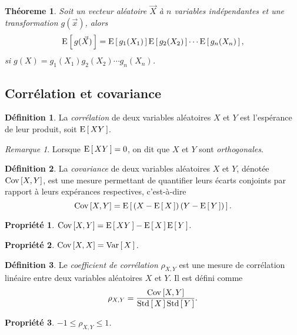 \documentclass[11pt]{article}
\makeatletter
\newcommand\Esp[1]{%
	\ensuremath{%
		\mathrm{E}\left[\,#1\,\right]%
	}%
}%
\newcommand\Var[1]{%
	\ensuremath{%
		\mathrm{Var}\left[\,#1\,\right]%
	}%
}%
\newcommand\Std[1]{%
	\ensuremath{%
		\mathrm{Std}\left[\,#1\,\right]%
	}%
}%
\newcommand\Cov[2]{%
	\ensuremath{%
		\mathrm{Cov}\left[#1,#2\right]%
	}%
}%
\newtheorem{theoreme}{Théoreme}[section]
\newtheorem{property}{Propriété}
\theoremstyle{remark}
\newtheorem*{remark}{Remarque}
\theoremstyle{definition}
\newtheorem*{@definition}{Définition}
\newenvironment{definition}{%
	\begin{@definition}%
}{%
	\end{@definition}%
	\setcounter{property}{0}%
}
\makeatother
\begin{document}
\begin{theoreme}
	Soit un vecteur aléatoire $\vec{X}$ à $n$ variables indépendantes et une
	transformation $g(\vec{x})$, alors
	\begin{equation*}
		\Esp{g(\vec{X})}=\Esp{g_1(X_1)}\Esp{g_2(X_2)}\cdots\Esp{g_n(X_n)},
	\end{equation*}
	si $g(X)=g_1(X_1)g_2(X_2)\cdots g_n(X_n)$.
\end{theoreme}

\subsection{Corrélation et covariance}
\begin{definition}
	La \textit{corrélation} de deux variables aléatoires $X$ et $Y$ est
	l'espérance de leur produit, soit $\Esp{XY}$.
\end{definition}

\begin{remark}
	Lorsque $\Esp{XY}=0$, on dit que $X$ et $Y$ sont \textit{orthogonales}.
\end{remark}

\begin{definition}
	La \textit{covariance} de deux variables aléatoires $X$ et $Y$, dénotée
	$\Cov{X}{Y}$, est une mesure permettant de quantifier leurs écarts
	conjoints par rapport à leurs expérances respectives, c'est-à-dire
	\begin{equation*}
		\Cov{X}{Y}=\Esp{\left(X-\Esp{X}\right)\left(Y-\Esp{Y}\right)}.
	\end{equation*}
\end{definition}

\begin{property}
	$\Cov{X}{Y}=\Esp{XY}-\Esp{X}\Esp{Y}$.
\end{property}

\begin{property}
	$\Cov{X}{X}=\Var{X}$.
\end{property}

\begin{definition}
	Le \textit{coefficient de corrélation} $\rho_{X,Y}$ est une mesure de
	corrélation linéaire entre deux variables aléatoires $X$ et $Y$. Il est
	défini comme
	\begin{equation*}
		\rho_{X,Y}=\frac{\Cov{X}{Y}}{\Std{X}\Std{Y}}.
	\end{equation*}
\end{definition}

\begin{property}
	$-1\leq\rho_{X,Y}\leq 1$.
\end{property}
\end{document}
